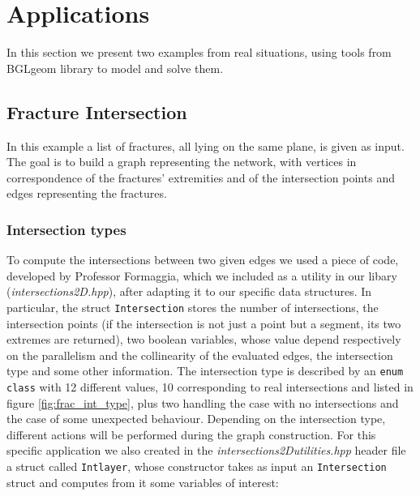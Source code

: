 \documentclass[10pt]{article} %
\begin{document}
	\section{Applications}
	In this section we present two examples from real situations, using tools from BGLgeom library to model and solve them.
	
	\subsection{Fracture Intersection}
	In this example a list of fractures, all lying on the same plane, is given as input. The goal is to build a graph representing the network, with vertices in correspondence of the fractures' extremities and of the intersection points and edges representing the fractures.
	
	\subsubsection{Intersection types}
	To compute the intersections between two given edges we used a piece of code, developed by Professor Formaggia, which we included as a utility in our libary (\textit{intersections2D.hpp}), after adapting it to our specific data structures. In particular, the struct \texttt{Intersection} stores the number of intersections, the intersection points (if the intersection is not just a point but a segment, its two extremes are returned), two boolean variables, whose value depend respectively on the parallelism and the collinearity of the evaluated edges, the intersection type and some other information.\newline
	The intersection type is described by an \texttt{enum class} with 12 different values, 10 corresponding to real intersections and listed in figure \ref{fig:frac_int_type}, plus two handling the case with no intersections and the case of some unexpected behaviour. Depending on the intersection type, different actions will be performed during the graph construction. \newline
	For this specific application we also created in the \textit{intersections2D\textunderscore utilities.hpp} header file a struct called \texttt{Int\textunderscore layer}, whose constructor takes as input an \texttt{Intersection} struct and computes from it some variables of interest:
\end{document}
